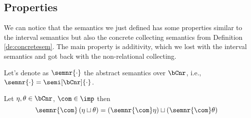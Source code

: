 \subsection{Properties}
\label{sub:nonrelprop}

We can notice that the semantics we just defined has some properties
similar to the interval semantics but also the concrete collecting
semantics from Definition \ref{de:concretesem}. The main property is
additivity, which we lost with the interval semantics and got back
with the non-relational collecting.

\medskip

\noindent
Let's denote as \(\semnr{\cdot}\) the abstract semantics over
\(\bCnr\), i.e., \(\semnr{\cdot} = \semi[\bCnr]{\cdot}\).

\begin{lemma}[Additivity]
  Let \(\eta, \theta \in \bCnr\), \(\com\in\imp\) then
  \begin{equation*}
    \semnr{\com}\left(\eta \sqcup \theta\right) = \left(\semnr{\com}\eta\right) \sqcup \left(\semnr{\com}\theta\right)
  \end{equation*}
\end{lemma}

